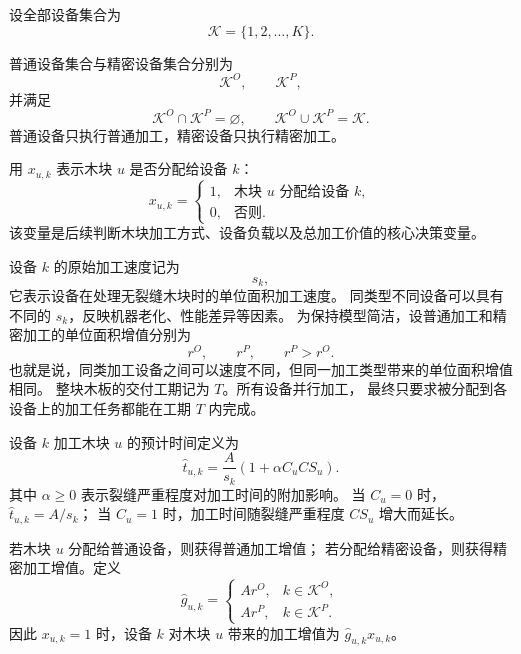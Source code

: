 ﻿\documentclass[UTF8,12pt,a4paper]{ctexart}
\begin{document}
\begin{description}[leftmargin=2em,labelsep=0.5em,itemsep=0.6em]
  \item[\textbf{设备集合：}]
设全部设备集合为
\[
\mathcal K=\{1,2,\ldots,K\}.
\]

  \item[\textbf{设备分类：}]
普通设备集合与精密设备集合分别为
\[
\mathcal K^O,\qquad \mathcal K^P,
\]
并满足
\[
\mathcal K^O\cap\mathcal K^P=\varnothing,\qquad
\mathcal K^O\cup\mathcal K^P=\mathcal K.
\]
普通设备只执行普通加工，精密设备只执行精密加工。

  \item[\textbf{木块与设备对应：}]
用 \(x_{u,k}\) 表示木块 \(u\) 是否分配给设备 \(k\)：
\[
x_{u,k}
=
\begin{cases}
1, & \text{木块 \(u\) 分配给设备 \(k\)},\\
0, & \text{否则}.
\end{cases}
\]
该变量是后续判断木块加工方式、设备负载以及总加工价值的核心决策变量。

  \item[\textbf{设备原始性能：}]
设备 \(k\) 的原始加工速度记为
\[
s_k,
\]
它表示设备在处理无裂缝木块时的单位面积加工速度。
同类型不同设备可以具有不同的 \(s_k\)，反映机器老化、性能差异等因素。
为保持模型简洁，设普通加工和精密加工的单位面积增值分别为
\[
r^O,\qquad r^P,\qquad r^P>r^O.
\]
也就是说，同类加工设备之间可以速度不同，但同一加工类型带来的单位面积增值相同。
整块木板的交付工期记为 \(T\)。所有设备并行加工，
最终只要求被分配到各设备上的加工任务都能在工期 \(T\) 内完成。

  \item[\textbf{\(u,k\) 对应的加工时间：}]
设备 \(k\) 加工木块 \(u\) 的预计时间定义为
\[
\boxed{
\widehat t_{u,k}
=
\frac{A}{s_k}
\left(1+\alpha C_u CS_u\right).
}
\]
其中 \(\alpha\ge0\) 表示裂缝严重程度对加工时间的附加影响。
当 \(C_u=0\) 时，\(\widehat t_{u,k}=A/s_k\)；
当 \(C_u=1\) 时，加工时间随裂缝严重程度 \(CS_u\) 增大而延长。

  \item[\textbf{\(u,k\) 对应的加工增值：}]
若木块 \(u\) 分配给普通设备，则获得普通加工增值；
若分配给精密设备，则获得精密加工增值。定义
\[
\widehat g_{u,k}
=
\begin{cases}
A r^O, & k\in\mathcal K^O,\\
A r^P, & k\in\mathcal K^P.
\end{cases}
\]
因此 \(x_{u,k}=1\) 时，设备 \(k\) 对木块 \(u\) 带来的加工增值为
\(\widehat g_{u,k}x_{u,k}\)。
\end{description}
\end{document}
